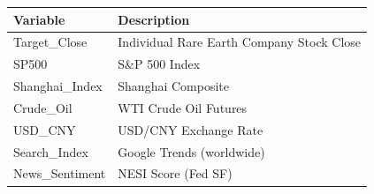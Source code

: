 \begin{tabular}{ll}
\toprule
Variable & Description \\
\midrule
Target\_Close & Individual Rare Earth Company Stock Close \\
SP500 & S\&P 500 Index \\
Shanghai\_Index & Shanghai Composite \\
Crude\_Oil & WTI Crude Oil Futures \\
USD\_CNY & USD/CNY Exchange Rate \\
Search\_Index & Google Trends (worldwide) \\
News\_Sentiment & NESI Score (Fed SF) \\
\bottomrule
\end{tabular}

